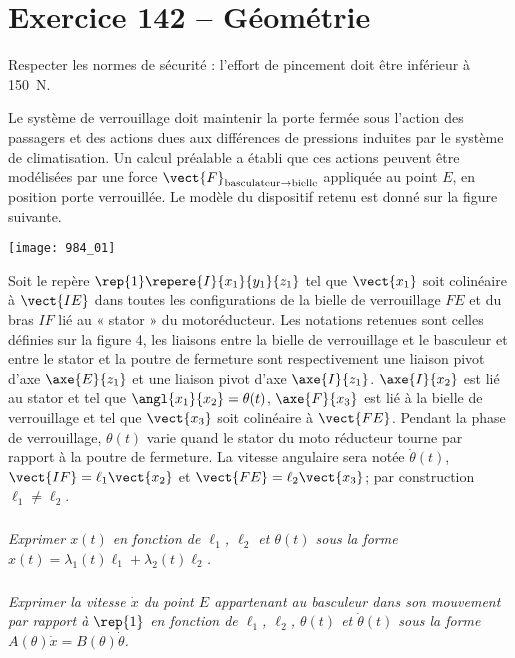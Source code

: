 \section*{Exercice 142 -- Géométrie}
\setcounter{exo}{0}


\begin{obj}
Respecter les normes de sécurité : l'effort de pincement doit être inférieur à \SI{150}{N}.
\end{obj}

Le système de verrouillage doit maintenir la porte fermée sous l’action des passagers et des
actions dues aux différences de pressions induites par le système de climatisation.
Un calcul préalable a établi que ces actions peuvent être modélisées par une
force $\vect{F}_{\text{basculateur}\rightarrow \text{bielle}}$ appliquée au point $E$, en position porte verrouillée. Le modèle du dispositif retenu est donné sur la figure suivante.

\begin{center}
\texttt{[image: 984\_01]}%
\end{center}

Soit le repère $\rep{1}\repere{I}{x_1}{y_1}{z_1}$ tel que $\vect{x_1}$ soit colinéaire à $\vect{IE}$ dans toutes
les configurations de la bielle de verrouillage $FE$ et du bras $IF$ lié au « stator »
du motoréducteur. Les notations retenues sont celles définies sur la figure 4, les
liaisons entre la bielle de verrouillage et le basculeur et entre le stator et la poutre
de fermeture sont respectivement une liaison pivot d’axe $\axe{E}{z_1}$ et une
liaison pivot d’axe $\axe{I}{z_1}$.
$\axe{I}{x_2}$ est lié au stator et tel que $\angl{x_1}{x_2}=\theta(t)$,
$\axe{F}{x_3}$ est lié à la bielle de verrouillage et tel que $\vect{x_3}$ soit colinéaire à $\vect{FE}$.
Pendant la phase de verrouillage, $\theta(t)$ varie quand le stator du moto réducteur
tourne par rapport à la poutre de fermeture. La vitesse angulaire sera notée
$\dot{\theta}(t)$, $\vect{IF}=\ell_1 \vect{x_2}$ et $\vect{FE}=\ell_2 \vect{x_3}$; par construction $\ell_1 \neq \ell_2$.

\subparagraph{}
\textit{Exprimer $x(t)$ en fonction de $\ell_1$, $\ell_2$ et $\theta(t)$ sous la forme
$x(t)=\lambda_1(t)\ell_1+\lambda_2(t)\ell_2$.}
\ifprof
\begin{corrige}
\end{corrige}
\else
\fi

\subparagraph{}
\textit{Exprimer la vitesse $\dot{x}$ du point $E$ appartenant au basculeur dans son mouvement
par rapport à $\rep{1}$ en fonction de $\ell_1$, $\ell_2$, $\theta(t)$ et $\dot{\theta}(t)$ sous la forme $A(\theta)\dot{x}=B(\theta)\dot{\theta}$.}
\ifprof
\begin{corrige}
\end{corrige}
\else
\fi


